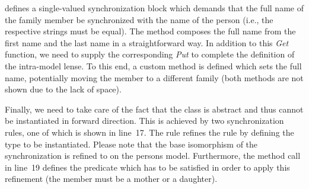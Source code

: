  defines a single-valued synchronization block which demands that the full name of the family member be synchronized with the name of the person (i.e., the respective strings must be equal). The method  composes the full name from the first name and the last name in a straightforward way. In addition to this \emph{Get} function, we need to supply the corresponding \emph{Put} to complete the definition of the intra-model lense. To this end, a custom method  is defined which sets the full name, potentially moving the member to a different family (both methods are not shown due to the lack of space).

Finally, we need to take care of the fact that the class  is abstract and thus cannot be instantiated in forward direction. This is achieved by two synchronization rules, one of which is shown in line~17. The rule  refines the rule  by defining the type to be instantiated. Please note that the base isomorphism of the synchronization is refined to  on the persons model. Furthermore, the method call in line~19 defines the predicate which has to be satisfied in order to apply this refinement (the member must be a mother or a daughter).  
